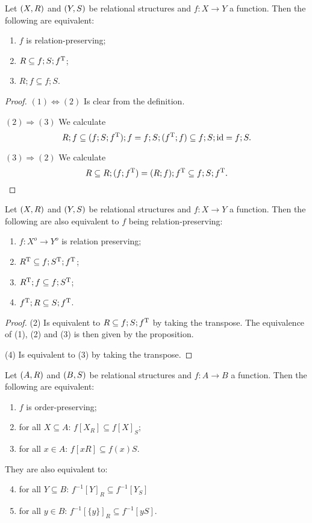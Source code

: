 \begin{proposition} \label{relationPreserving}
Let $\sSet{X, R}$ and $\sSet{Y, S}$ be relational structures and $f: X\to Y$ a function. Then the following are equivalent:
\begin{enumerate}
\item $f$ is relation-preserving;
\item $R \subseteq f;S;f^{\mathrm{T}}$;
\item $R;f \subseteq f;S$.
\end{enumerate}
\end{proposition}
\begin{proof}
$(1) \Leftrightarrow (2)$ Is clear from the definition.

$(2) \Rightarrow (3)$ We calculate
\[ R;f \subseteq (f;S;f^{\mathrm{T}});f = f;S;(f^{\mathrm{T}};f) \subseteq f;S;\operatorname{id} = f;S. \]

$(3) \Rightarrow (2)$ We calculate
\[ R \subseteq R;(f;f^{\mathrm{T}}) = (R;f);f^{\mathrm{T}} \subseteq f;S;f^{\mathrm{T}}. \]
\end{proof}
\begin{corollary} \label{relationPreservingTranspose}
Let $\sSet{X, R}$ and $\sSet{Y, S}$ be relational structures and $f: X\to Y$ a function. Then the following are also equivalent to $f$ being relation-preserving:
\begin{enumerate}
\item $f: X^o \to Y^o$ is relation preserving;
\item $R^{\mathrm{T}} \subseteq f;S^{\mathrm{T}};f^{\mathrm{T}}$;
\item $R^{\mathrm{T}};f \subseteq f;S^{\mathrm{T}}$;
\item $f^{\mathrm{T}};R \subseteq S;f^{\mathrm{T}}$.
\end{enumerate}
\end{corollary}
\begin{proof}
(2) Is equivalent to $R \subseteq f;S;f^{\mathrm{T}}$ by taking the transpose. The equivalence of (1), (2) and (3) is then given by the proposition.

(4) Is equivalent to (3) by taking the transpose.
\end{proof}
\begin{corollary} \label{functionImagesPreimagesAndPrincipalImages}
Let $\sSet{A,R}$ and $\sSet{B, S}$ be relational structures and $f: A\to B$ a function. Then the following are equivalent:
\begin{enumerate}
\item $f$ is order-preserving;
\item for all $X\subseteq A$: $f[X_R] \subseteq f[X]_S$;
\item for all $x\in A$: $f[xR] \subseteq f(x)S$.
\end{enumerate}
They are also equivalent to:
\begin{enumerate} \setcounter{enumi}{3}
\item for all $Y\subseteq B$: $f^{-1}[Y]_R \subseteq f^{-1}[Y_S]$
\item for all $y\in B$: $f^{-1}[\{y\}]_R \subseteq f^{-1}[yS]$.
\end{enumerate}
\end{corollary}
